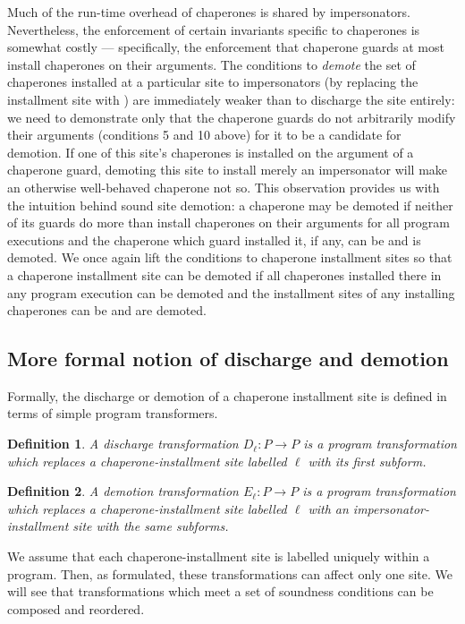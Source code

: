 \documentclass{sigplanconf}
\newtheorem{definition}{Definition}
\begin{document}
Much of the run-time overhead of chaperones is shared by impersonators.
Nevertheless, the enforcement of certain invariants specific to chaperones is somewhat costly --- specifically, the enforcement that chaperone guards at most install chaperones on their arguments.
The conditions to \emph{demote} the set of chaperones installed at a particular site to impersonators (by replacing the  installment site with ) are immediately weaker than to discharge the site entirely: we need to demonstrate only that the chaperone guards do not arbitrarily modify their arguments (conditions 5 and 10 above) for it to be a candidate for demotion.
If one of this site's chaperones is installed on the argument of a chaperone guard, demoting this site to install merely an impersonator will make an otherwise well-behaved chaperone not so.
This observation provides us with the intuition behind sound site demotion: a chaperone may be demoted if neither of its guards do more than install chaperones on their arguments for all program executions and the chaperone which guard installed it, if any, can be and is demoted. 
We once again lift the conditions to chaperone installment sites so that a chaperone installment site can be demoted if all chaperones installed there in any program execution can be demoted and the installment sites of any installing chaperones can be and are demoted.

\subsection{More formal notion of discharge and demotion}

Formally, the discharge or demotion of a chaperone installment site is defined in terms of simple program transformers.

\begin{definition}
A \emph{discharge transformation} $D_\ell : P\rightarrow P$ is a program transformation which replaces a chaperone-installment site labelled $\ell$ with its first subform.
\end{definition}

\begin{definition}
A \emph{demotion transformation} $E_\ell : P\rightarrow P$ is a program transformation which replaces a chaperone-installment site labelled $\ell$ with an impersonator-installment site with the same subforms.
\end{definition}

We assume that each chaperone-installment site is labelled uniquely within a program.
Then, as formulated, these transformations can affect only one site.
We will see that transformations which meet a set of soundness conditions can be composed and reordered.
\end{document}
